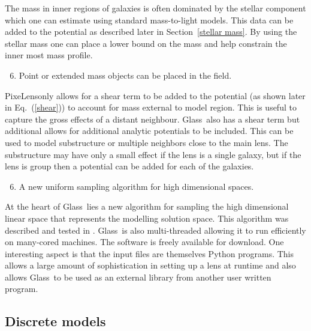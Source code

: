 \documentclass[galley]{mn2e}
\newcommand{\Glass}{{\sc Glass}}
\newcommand{\PixeLens}{{\sc PixeLens}}
\newcommand{\eqnref}[1] {Eq.~(\ref{#1})}
\newcommand{\secref}[1] {Section~\ref{#1}}
\begin{document}
%
The mass in inner regions of galaxies is often dominated by the stellar component
which one can estimate using standard mass-to-light models. This data can be added
to the potential as described later in \secref{stellar mass}. By using the stellar
mass one can place a lower bound on the mass and help constrain the inner most
mass profile.
%
\begin{enumerate}
  \setcounter{enumi}{5}
  \item Point or extended mass objects can be placed in the field.
\end{enumerate}
%
\PixeLens only allows for a shear term to be added to the potential (as shown
later in \eqnref{shear}) to account for mass external to model region. This
is useful to capture the gross effects of a distant neighbour. \Glass\ also
has a shear term but additional allows for additional analytic potentials to
be included. This can be used to model substructure or multiple neighbors close
to the main lens. The substructure may have only a small effect if the lens is
a single galaxy, but if the lens is group then a potential can be added for
each of the galaxies.
%
\begin{enumerate}
  \setcounter{enumi}{5}
  \item A new uniform sampling algorithm for high dimensional spaces.
\end{enumerate}
%
At the heart of \Glass\ lies a new algorithm for sampling the high dimensional
linear space that represents the modelling solution space. This algorithm was
described and tested in \cite{}. \Glass\ is also multi-threaded allowing it to
run efficiently on many-cored machines.  The software is freely available for
download. One interesting aspect is that the input files are themselves Python
programs. This allows a large amount of sophistication in setting up a lens at
runtime and also allows \Glass\ to be used as an external library from another
user written program.

\subsection{Discrete models}
\end{document}
